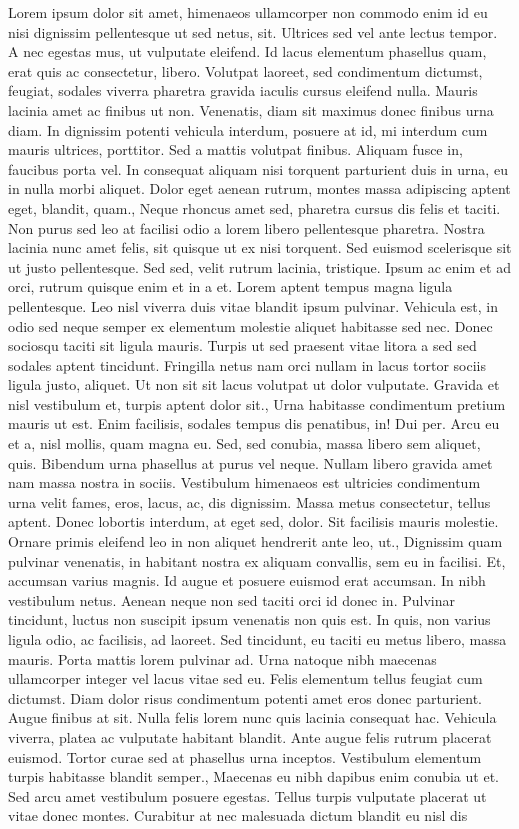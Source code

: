 \documentclass{source/tex/templates/maththesis}
\begin{document}
Lorem ipsum dolor sit amet, himenaeos ullamcorper non commodo enim id eu nisi dignissim pellentesque ut sed netus, sit. Ultrices sed vel ante lectus tempor. A nec egestas mus, ut vulputate eleifend. Id lacus elementum phasellus quam, erat quis ac consectetur, libero. Volutpat laoreet, sed condimentum dictumst, feugiat, sodales viverra pharetra gravida iaculis cursus eleifend nulla. Mauris lacinia amet ac finibus ut non. Venenatis, diam sit maximus donec finibus urna diam. In dignissim potenti vehicula interdum, posuere at id, mi interdum cum mauris ultrices, porttitor. Sed a mattis volutpat finibus. Aliquam fusce in, faucibus porta vel. In consequat aliquam nisi torquent parturient duis in urna, eu in nulla morbi aliquet. Dolor eget aenean rutrum, montes massa adipiscing aptent eget, blandit, quam., Neque rhoncus amet sed, pharetra cursus dis felis et taciti. Non purus sed leo at facilisi odio a lorem libero pellentesque pharetra. Nostra lacinia nunc amet felis, sit quisque ut ex nisi torquent. Sed euismod scelerisque sit ut justo pellentesque. Sed sed, velit rutrum lacinia, tristique. Ipsum ac enim et ad orci, rutrum quisque enim et in a et. Lorem aptent tempus magna ligula pellentesque. Leo nisl viverra duis vitae blandit ipsum pulvinar. Vehicula est, in odio sed neque semper ex elementum molestie aliquet habitasse sed nec. Donec sociosqu taciti sit ligula mauris. Turpis ut sed praesent vitae litora a sed sed sodales aptent tincidunt. Fringilla netus nam orci nullam in lacus tortor sociis ligula justo, aliquet. Ut non sit sit lacus volutpat ut dolor vulputate. Gravida et nisl vestibulum et, turpis aptent dolor sit., Urna habitasse condimentum pretium mauris ut est. Enim facilisis, sodales tempus dis penatibus, in! Dui per. Arcu eu et a, nisl mollis, quam magna eu. Sed, sed conubia, massa libero sem aliquet, quis. Bibendum urna phasellus at purus vel neque. Nullam libero gravida amet nam massa nostra in sociis. Vestibulum himenaeos est ultricies condimentum urna velit fames, eros, lacus, ac, dis dignissim. Massa metus consectetur, tellus aptent. Donec lobortis interdum, at eget sed, dolor. Sit facilisis mauris molestie. Ornare primis eleifend leo in non aliquet hendrerit ante leo, ut., Dignissim quam pulvinar venenatis, in habitant nostra ex aliquam convallis, sem eu in facilisi. Et, accumsan varius magnis. Id augue et posuere euismod erat accumsan. In nibh vestibulum netus. Aenean neque non sed taciti orci id donec in. Pulvinar tincidunt, luctus non suscipit ipsum venenatis non quis est. In quis, non varius ligula odio, ac facilisis, ad laoreet. Sed tincidunt, eu taciti eu metus libero, massa mauris. Porta mattis lorem pulvinar ad. Urna natoque nibh maecenas ullamcorper integer vel lacus vitae sed eu. Felis elementum tellus feugiat cum dictumst. Diam dolor risus condimentum potenti amet eros donec parturient. Augue finibus at sit. Nulla felis lorem nunc quis lacinia consequat hac. Vehicula viverra, platea ac vulputate habitant blandit. Ante augue felis rutrum placerat euismod. Tortor curae sed at phasellus urna inceptos. Vestibulum elementum turpis habitasse blandit semper., Maecenas eu nibh dapibus enim conubia ut et. Sed arcu amet vestibulum posuere egestas. Tellus turpis vulputate placerat ut vitae donec montes. Curabitur at nec malesuada dictum blandit eu nisl dis 
\end{document}
